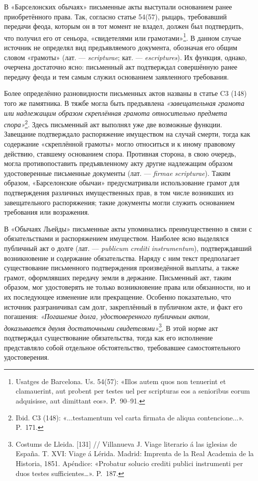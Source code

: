 В «Барселонских обычаях» письменные акты выступали основанием ранее приобретённого права. Так, согласно статье 54(57), рыцарь, требовавший передачи феода, которым он в тот момент не владел, должен был подтвердить, что получил его от сеньора, «свидетелями или грамотами»\footnote{Usatges de Barcelona. Us. 54(57): «Illos autem quos non tenuerint et clamauerint, aut probent per testes uel per scripturas eos a senioribus eorum adquisisse, aut dimittant eos». P.~90--91.}. В данном случае источник не определял вид предъявляемого документа, обозначая его общим словом «грамоты» (лат. --- \emph{scripturae}; кат. --- \emph{escriptures}). Их функция, однако, очерчена достаточно ясно: письменный акт подтверждал совершённую ранее передачу феода и тем самым служил основанием заявленного требования.

Более определённо разновидности письменных актов названы в статье C3 (148) того же памятника. В тяжбе могла быть предъявлена \emph{«завещательная грамота или надлежащим образом скреплённая грамота относительно предмета спора»}\footnote{Ibid. C3 (148): «...testamentum vel carta firmata de aliqua contencione...». P.~171.}. Здесь письменный акт выполнял уже две возможные функции. Завещание подтверждало распоряжение имуществом на случай смерти, тогда как содержание «скреплённой грамоты» могло относиться и к иному правовому действию, ставшему основанием спора. Противная сторона, в свою очередь, могла противопоставить предъявленному акту другие надлежащим образом удостоверенные письменные документы (лат. --- \emph{firmae}\emph{ }\emph{scripturae}). Таким образом, «Барселонские обычаи» предусматривали использование грамот для подтверждения различных имущественных прав, в том числе возникших из завещательного распоряжения; такие документы могли служить основанием требования или возражения.

В «Обычаях Льейды» письменные акты упоминались преимущественно в связи с обязательствами и распоряжением имуществом. Наиболее ясно выделялся публичный акт о долге (лат. --- \emph{publicum}\emph{ }\emph{crediti}\emph{ }\emph{instrumentum}), подтверждавший возникновение и содержание обязательства. Наряду с ним текст предполагает существование письменного подтверждения произведённой выплаты, а также грамот, оформлявших передачу земли в держание. Письменный акт, таким образом, мог удостоверять не только возникновение права или обязанности, но и их последующее изменение или прекращение. Особенно показательно, что источник разграничивал сам долг, закреплённый в публичном акте, и факт его погашения: \emph{«Погашение долга, удостоверенного публичным актом, доказывается двумя достаточными свидетелями»}\footnote{Costums de Lleida. [131] // Villanueva J. Viage literario á las iglesias de España. T. XVI: Viage á Lérida. Madrid: Imprenta de la Real Academia de la Historia, 1851. Apéndice: «Probatur solucio crediti publici instrumenti per duos testes sufficientes…». P.~187.}. В этой норме акт подтверждал существование обязательства, тогда как его исполнение представляло собой отдельное обстоятельство, требовавшее самостоятельного удостоверения.

